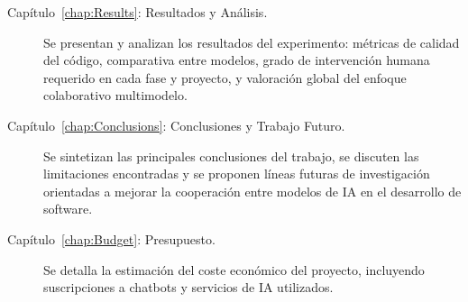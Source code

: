 \begin{description}
  \item[Capítulo~\ref{chap:Results}: Resultados y Análisis.] Se presentan y analizan los resultados del experimento: métricas de calidad del código, comparativa entre modelos, grado de intervención humana requerido en cada fase y proyecto, y valoración global del enfoque colaborativo multimodelo.

  \item[Capítulo~\ref{chap:Conclusions}: Conclusiones y Trabajo Futuro.] Se sintetizan las principales conclusiones del trabajo, se discuten las limitaciones encontradas y se proponen líneas futuras de investigación orientadas a mejorar la cooperación entre modelos de \ac{IA} en el desarrollo de software.

  \item[Capítulo~\ref{chap:Budget}: Presupuesto.] Se detalla la estimación del coste económico del proyecto, incluyendo suscripciones a chatbots y servicios de IA utilizados.
\end{description}

